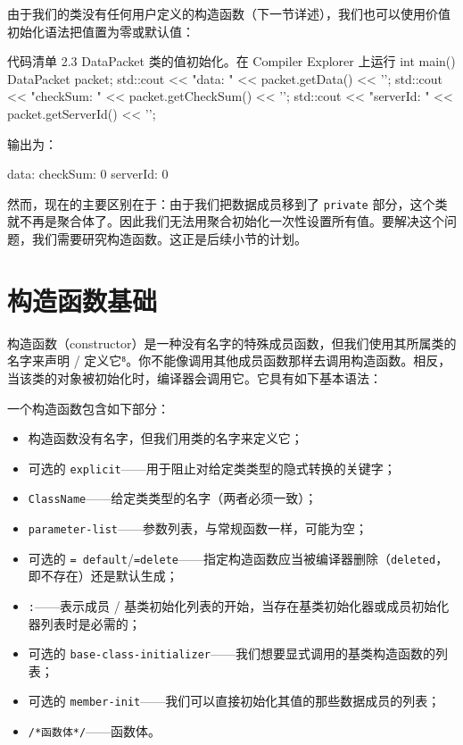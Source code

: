 由于我们的类没有任何用户定义的构造函数（下一节详述），我们也可以使用价值初始化语法把值置为零或默认值：


\begin{codeboxt}[cpp]{代码清单 2.3 DataPacket 类的值初始化。在 Compiler Explorer 上运行}
int main() {
DataPacket packet{};
std::cout << "data: " << packet.getData() << '\n';
std::cout << "checkSum: " << packet.getCheckSum() << '\n';
std::cout << "serverId: " << packet.getServerId() << '\n';
}
\end{codeboxt}

输出为：

\begin{codebox}[cpp]
data:
checkSum: 0
serverId: 0
\end{codebox}

然而，现在的主要区别在于：由于我们把数据成员移到了 \texttt{private} 部分，这个类就不再是聚合体了。因此我们无法用聚合初始化一次性设置所有值。要解决这个问题，我们需要研究构造函数。这正是后续小节的计划。

\section{构造函数基础}

构造函数（constructor）是一种没有名字的特殊成员函数，但我们使用其所属类的名字来声明 / 定义它⁸。你不能像调用其他成员函数那样去调用构造函数。相反，当该类的对象被初始化时，编译器会调用它。它具有如下基本语法：


一个构造函数包含如下部分：


\begin{itemize}
\item 构造函数没有名字，但我们用类的名字来定义它；
\item 可选的 \texttt{explicit}——用于阻止对给定类类型的隐式转换的关键字；
\item \texttt{ClassName}——给定类类型的名字（两者必须一致）；
\item \texttt{parameter-list}——参数列表，与常规函数一样，可能为空；
\item 可选的 \texttt{= default}/\texttt{=delete}——指定构造函数应当被编译器删除（\texttt{deleted}，即不存在）还是默认生成；
\item \texttt{:}——表示成员 / 基类初始化列表的开始，当存在基类初始化器或成员初始化器列表时是必需的；
\item 可选的 \texttt{base-class-initializer}——我们想要显式调用的基类构造函数的列表；
\item 可选的 \texttt{member-init}——我们可以直接初始化其值的那些数据成员的列表；
\item \texttt{/*函数体*/}——函数体。
\end{itemize}

